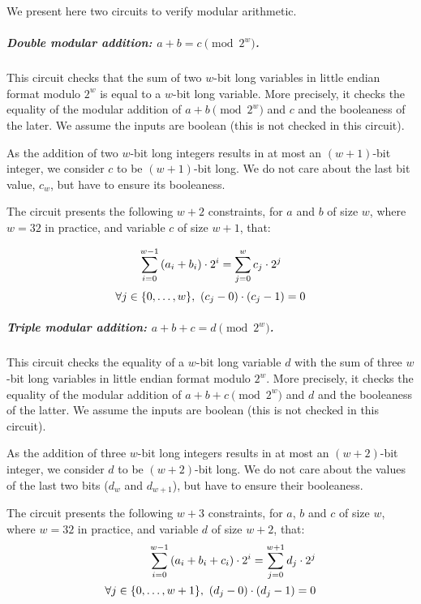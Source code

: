 We present here two circuits to verify modular arithmetic.

\subparagraph{Double modular addition: {\boldmath $a + b = c \pmod {2^w}$}.}

This circuit checks that the sum of two $w$-bit long variables in little endian format modulo ${2^w}$ is equal to a $w$-bit long variable. More precisely, it checks the equality of the modular addition of $a+b \pmod {2^w}$ and $c$ and the booleaness of the later. We assume the inputs are boolean (this is not checked in this circuit).

As the addition of two $w$-bit long integers results in at most an $(w + 1)$-bit integer, we consider $c$ to be $(w + 1)$-bit long. We do not care about the last bit value, $c_w$, but have to ensure its booleaness.

The circuit presents the following $w+2$ constraints, for $a$ and $b$ of size $w$, where $w=32$ in practice, and variable $c$ of size $w+1$, that:

\begin{equation}
  \label{implementation:eq:modular_sum}
  \sum_{i=0}^{w - 1} \left( a_i + b_i \right ) \cdot 2^i = \sum_{j=0}^{w} c_j \cdot 2^j\\
\end{equation}
\begin{equation}
  \label{implementation:eq:modular_bool}
  \forall j \in \{{0},\ldots,{w}\},\ (c_j - 0) \cdot (c_j - 1) = 0
\end{equation}

\subparagraph{Triple modular addition: {\boldmath $a + b + c = d \pmod {2^w}$}.}

This circuit checks the equality of a $w$-bit long variable $d$ with the sum of three $w$-bit long variables in little endian format modulo ${2^w}$. More precisely, it checks the equality of the modular addition of $a+b+c \pmod {2^w}$ and $d$ and the booleaness of the latter. We assume the inputs are boolean (this is not checked in this circuit).

As the addition of three $w$-bit long integers results in at most an $(w + 2)$-bit integer, we consider $d$ to be $(w + 2)$-bit long. We do not care about the values of the last two bits ($d_w$ and $d_{w+1}$), but have to ensure their booleaness.

The circuit presents the following $w+3$ constraints, for $a$, $b$ and $c$ of size $w$, where $w=32$ in practice, and variable $d$ of size $w+2$, that:
\begin{align}
  \sum_{i=0}^{w - 1} \left( a_i + b_i + c_i \right ) \cdot 2^i = \sum_{j=0}^{w+1} d_j \cdot 2^j \label{implementation:eq:triple_modular_sum} \\
  \forall j \in \{{0},\ldots,{w + 1}\},\ (d_j - 0) \cdot (d_j - 1) = 0 \label{implementation:eq:triple_modular_bool}
\end{align}

